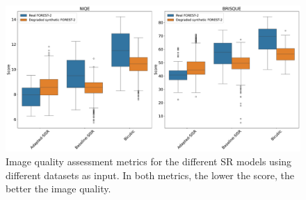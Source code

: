         \begin{figure}[H]
            \centering
            \includegraphics[scale=0.28]{Includes/5-target-iqa-results.pdf}
            \caption{Image quality assessment metrics for the different SR models using different datasets as input. 
                    In both metrics, the lower the score, the better the image quality.}
            \label{fig:5-target-iqa-results}
        \end{figure}


        

        
    